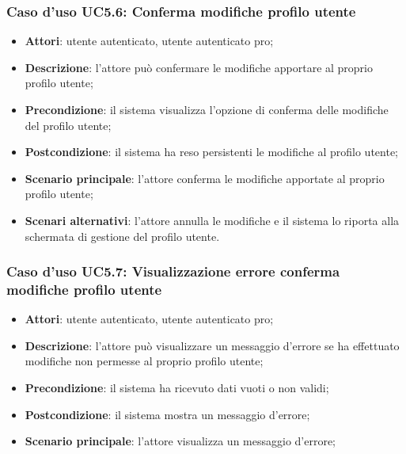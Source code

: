 \subsubsection{Caso d'uso UC5.6: Conferma modifiche profilo utente}

\begin{itemize}
	\item \textbf{Attori}: utente autenticato, utente autenticato pro;
	\item \textbf{Descrizione}: l'attore può confermare le modifiche apportare al proprio profilo utente; 
	\item \textbf{Precondizione}: il sistema visualizza l'opzione di conferma delle modifiche del profilo utente;
	\item \textbf{Postcondizione}: il sistema ha reso persistenti le modifiche al profilo utente;
	\item \textbf{Scenario principale}: l'attore conferma le modifiche apportate al proprio profilo utente;
	\item \textbf{Scenari alternativi}: l'attore annulla le modifiche e il sistema lo riporta alla schermata di gestione del profilo utente.
\end{itemize}

\subsubsection{Caso d'uso UC5.7: Visualizzazione errore conferma modifiche profilo utente}

\begin{itemize}
	\item \textbf{Attori}:  utente autenticato, utente autenticato pro;
	\item \textbf{Descrizione}: l'attore può visualizzare un messaggio d'errore se ha effettuato modifiche non permesse al proprio profilo utente;
	\item \textbf{Precondizione}: il sistema ha ricevuto dati vuoti o non validi;
	\item \textbf{Postcondizione}: il sistema mostra un messaggio d'errore;
	\item \textbf{Scenario principale}: l'attore visualizza un messaggio d'errore;
\end{itemize}

